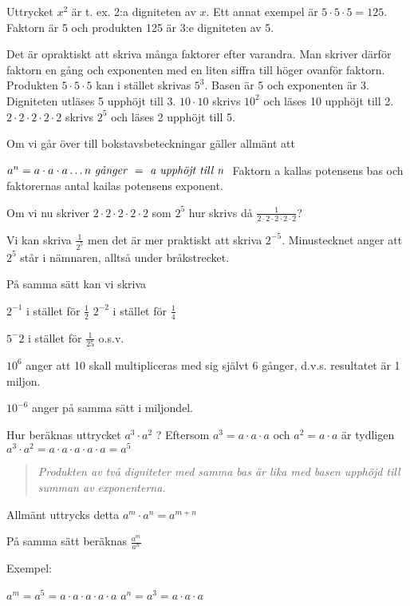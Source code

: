 Uttrycket \(x^2\) är t. ex. 2:a digniteten av \(x\).
Ett annat exempel är \(5 \cdot 5 \cdot 5 = 125\).
Faktorn är 5 och produkten 125 är 3:e digniteten av 5.

Det är opraktiskt att skriva många faktorer efter varandra. Man skriver därför
faktorn en gång och exponenten med en liten siffra till höger ovanför faktorn.
Produkten \(5 \cdot 5 \cdot 5\) kan i stället skrivas \(5^3\).
Basen är 5 och exponenten är 3. Digniteten utläses 5 upphöjt till 3.
\(10 \cdot 10\) skrivs \(10^2\) och läses 10 upphöjt till 2.
\(2 \cdot 2 \cdot 2 \cdot 2 \cdot 2\) skrivs \(2^5\) och läses 2 upphöjt
till 5.

Om vi går över till bokstavsbeteckningar gäller allmänt att

\(a^n= a \cdot a \cdot a \ldots n \textrm{ \emph{g{\aa}nger} } = \textrm{ \emph{a
  upphöjt till n} }\) 
Faktorn a kallas potensens bas och faktorernas antal kailas potensens exponent.

Om vi nu skriver \(2 \cdot 2 \cdot 2 \cdot 2 \cdot 2\) som \(2^5\) hur skrivs då
\(\frac{1}{2 \cdot 2 \cdot 2 \cdot 2 \cdot 2}\)?

Vi kan skriva \(\frac{1}{2^5}\) men det är mer praktiskt att skriva \(2^{-5}\).
Minustecknet anger att \(2^5\) står i nämnaren, alltså under bråkstrecket.

På samma sätt kan vi skriva

\(2^{-1}\) i stället för \(\frac{1}{2}\) \(2^{-2}\) i stället för \(\frac{1}{4}\)

\(5^-2\) i stället för \(\frac{1}{25}\) o.s.v.

\(10^6\) anger att 10 skall multipliceras med sig självt 6 gånger, d.v.s.
resultatet är 1 miljon.

\(10^{-6}\) anger på samma sätt i miljondel.

Hur beräknas uttrycket \(a^3 \cdot a^2\) ?
Eftersom \(a^3 = a \cdot a \cdot a\) och \(a^2 = a \cdot a\) är tydligen
\(a^3 \cdot a^2 = a \cdot a \cdot a \cdot a \cdot a = a^5\)

\begin{quote}\emph{Produkten av två digniteter med samma bas är lika med basen upphöjd till summan av exponenterna.}\end{quote}

Allmänt uttrycks detta \(a^m \cdot a^n = a^{m+n}\)

På samma sätt beräknas \(\frac{a^m}{a^n}\)

Exempel:

\(a^m = a^5 = a \cdot a \cdot a \cdot a \cdot a\)
\(a^n = a^3 = a \cdot a \cdot a\)

